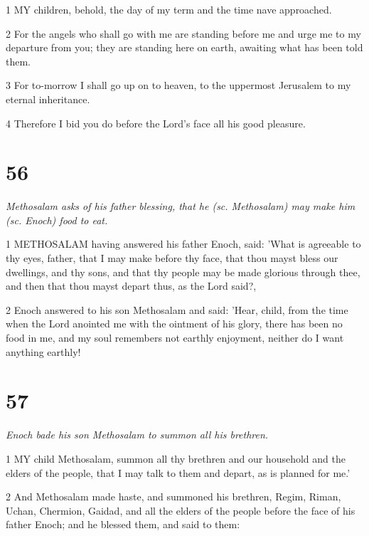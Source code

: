 \par 1 MY children, behold, the day of my term and the time nave approached.

\par 2 For the angels who shall go with me are standing before me and urge me to my departure from you; they are standing here on earth, awaiting what has been told them.

\par 3 For to-morrow I shall go up on to heaven, to the uppermost Jerusalem to my eternal inheritance.

\par 4 Therefore I bid you do before the Lord's face all his good pleasure.

\chapter{56}

\par \textit{Methosalam asks of his father blessing, that he (sc. Methosalam) may make him (sc. Enoch) food to eat.}

\par 1 METHOSALAM having answered his father Enoch, said: 'What is agreeable to thy eyes, father, that I may make before thy face, that thou mayst bless our dwellings, and thy sons, and that thy people may be made glorious through thee, and then that thou mayst depart thus, as the Lord said?,

\par 2 Enoch answered to his son Methosalam and said: 'Hear, child, from the time when the Lord anointed me with the ointment of his glory, there has been no food in me, and my soul remembers not earthly enjoyment, neither do I want anything earthly!

\chapter{57}

\par \textit{Enoch bade his son Methosalam to summon all his brethren.}

\par 1 MY child Methosalam, summon all thy brethren and our household and the elders of the people, that I may talk to them and depart, as is planned for me.'

\par 2 And Methosalam made haste, and summoned his brethren, Regim, Riman, Uchan, Chermion, Gaidad, and all the elders of the people before the face of his father Enoch; and he blessed them, and said to them:

